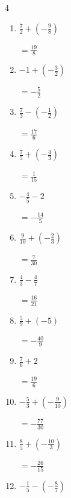 \begin{multicols}{4}
\begin{enumerate}
  \item $\displaystyle \frac{7}{2} + \left(-\frac{9}{8}\right)$

        $\displaystyle =\frac{19}{8}$

  \item $\displaystyle -1 + \left(-\frac{3}{2}\right)$

        $\displaystyle =-\frac{5}{2}$

\columnbreak %

\resetques

  \item $\displaystyle \frac{7}{3} - \left(-\frac{1}{2}\right)$

        $\displaystyle =\frac{17}{6}$

  \item $\displaystyle \frac{7}{5} + \left(-\frac{4}{3}\right)$

        $\displaystyle =\frac{1}{15}$

  \item $\displaystyle -\frac{4}{5} - 2$

        $\displaystyle =-\frac{14}{5}$

  \item $\displaystyle \frac{9}{10} + \left(-\frac{2}{3}\right)$

        $\displaystyle =\frac{7}{30}$

  \item $\displaystyle \frac{4}{3} - \frac{4}{7}$

        $\displaystyle =\frac{16}{21}$

  \item $\displaystyle \frac{5}{9} + \left(-5\right)$

        $\displaystyle =-\frac{40}{9}$

  \item $\displaystyle \frac{7}{6} + 2$

        $\displaystyle =\frac{19}{6}$

  \item $\displaystyle -\frac{5}{3} + \left(-\frac{9}{10}\right)$

        $\displaystyle =-\frac{77}{30}$

  \item $\displaystyle \frac{8}{5} + \left(-\frac{10}{3}\right)$

        $\displaystyle =-\frac{26}{15}$

  \item $\displaystyle -\frac{1}{5} - \left(-\frac{8}{7}\right)$


\end{enumerate}
\end{multicols}
